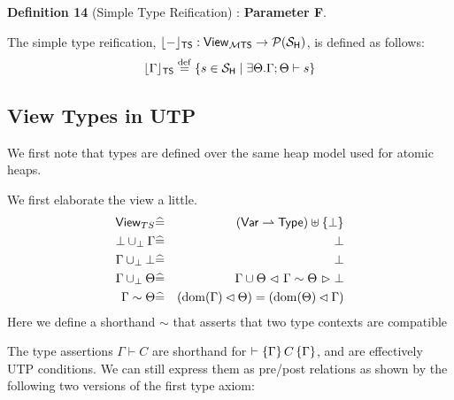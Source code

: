 \textbf{Definition 14} (Simple Type Reification) : \textbf{Parameter F}.

The simple type reification,
$\lfloor{-}\rfloor_{\mathsf{TS}} : \mathsf{View}_{\mathcal M \mathsf{TS}} \rightarrow \mathcal{P}(\mathcal{S}_{\mathsf{H}})$,
is defined as follows:
\[
  \lfloor{\Gamma}\rfloor_{\mathsf{TS}}
  \stackrel{\mathrm{def}}{=} \{ s \in \mathcal{S}_{\mathsf{H}} \mid \exists \Theta . \Gamma;\Theta \vdash s\}
\]

\subsection{View Types in UTP}

We first note that types are defined over the same heap model
used for atomic heaps.

We first elaborate the view a little.
\begin{eqnarray*}
   \mathsf{View}_{TS} &\widehat=& (\mathsf{Var} \rightharpoonup \mathsf{Type})\uplus\{\bot\}
\\ \bot \mathbin{\cup_{\bot}} \Gamma &\widehat=& \bot
\\ \Gamma \mathbin{\cup_{\bot}} \bot &\widehat=& \bot
\\ \Gamma \mathbin{\cup_{\bot}} \Theta
     &\widehat=&
       \Gamma \cup \Theta
       \mathrel{\lhd{~\Gamma \sim \Theta~}\rhd}
       \bot
\\ \Gamma \sim \Theta &\widehat=& (\mathrm{dom}(\Gamma)\lhd \Theta) = (\mathrm{dom}(\Theta)\lhd\Gamma)
\end{eqnarray*}
Here we define a shorthand $\sim$ that asserts that two type contexts
are compatible

The type assertions $\Gamma \vdash C$
are shorthand for $\vdash \{\Gamma\}\, {C}\, \{\Gamma\}$,
and are effectively UTP conditions.
We can still express them as pre/post relations as shown
by the following two versions of the first type axiom:

